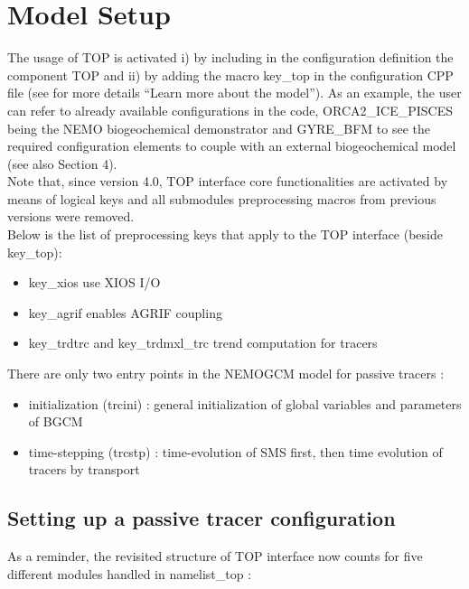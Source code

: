 \documentclass[../main/TOP_manual]{subfiles}
\begin{document}
\chapter{ Model Setup}

The usage of TOP is activated i) by including in the configuration definition the component TOP and ii) by adding the macro key\_top in the configuration CPP file (see for more details “Learn more about the model”).
As an example, the user can refer to already available configurations in the code, ORCA2\_ICE\_PISCES being the NEMO biogeochemical demonstrator and GYRE\_BFM to see the required configuration elements to couple with an external biogeochemical model (see also Section 4).\\
Note that, since version 4.0, TOP interface core functionalities are activated by means of logical keys and all submodules preprocessing macros from previous versions were removed.\\

Below is the list of preprocessing keys that apply to the TOP interface (beside key\_top):
\begin{itemize}
	\item key\_xios use XIOS I/O
	\item key\_agrif enables AGRIF coupling
	\item key\_trdtrc and key\_trdmxl\_trc trend computation for tracers
\end{itemize}

There are only two entry points in the NEMOGCM model for passive tracers :
\begin{itemize}
	\item initialization (trcini) : general initialization of global variables and parameters of BGCM
	\item time-stepping (trcstp) : time-evolution of SMS first, then time evolution of tracers by transport
\end{itemize}

\section{ Setting up a passive tracer configuration}

As a reminder, the revisited structure of TOP interface now counts for five different modules handled in namelist\_top :
\end{document}
